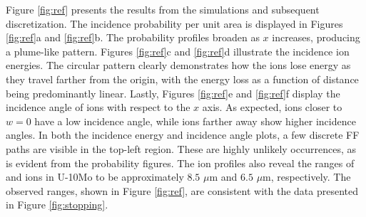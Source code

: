 \documentclass[review]{elsarticle}
\newcommand{\Y}{\ce{_{39}^{97}Y}\xspace}
\newcommand{\I}{\ce{_{53}^{136}I}\xspace}
\begin{document}
Figure \ref{fig:ref} presents the results
from the simulations and subsequent discretization.
The incidence probability per unit area
is displayed in Figures \ref{fig:ref}a and \ref{fig:ref}b.
The probability profiles broaden as $x$ increases,
producing a plume-like pattern.
Figures \ref{fig:ref}c and \ref{fig:ref}d
illustrate the incidence ion energies.
The circular pattern clearly demonstrates how the ions lose energy
as they travel farther from the origin,
with the energy loss as a function of distance being predominantly linear.
Lastly, Figures \ref{fig:ref}e and \ref{fig:ref}f display
the incidence angle of ions with respect to the $x$ axis.
As expected, ions closer to $w = 0$ have a low incidence angle,
while ions farther away show higher incidence angles.
In both the incidence energy and incidence angle plots,
a few discrete FF paths are visible in the top-left region.
These are highly unlikely occurrences,
as is evident from the probability figures.
The ion profiles also reveal the ranges of \Y and \I ions in U-10Mo
to be approximately $8.5$ $\mu$m and $6.5$ $\mu$m, respectively.
The observed ranges, shown in Figure \ref{fig:ref},
are consistent with the data presented in Figure \ref{fig:stopping}.
\end{document}
